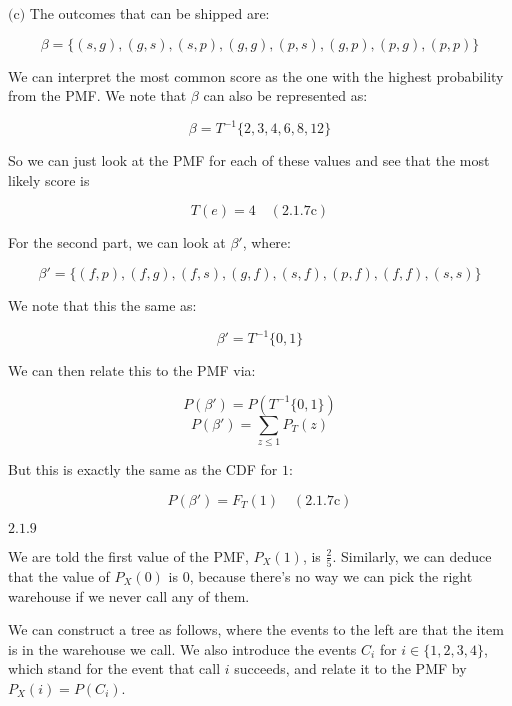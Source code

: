 \documentclass{article}
\newcommand{\problem}[2]{$\boxed{\text{#1.#2}}$}
\newcommand{\subproblem}[3]{$\boxed{\text{(#3)}}$}
\newcommand{\subsolution}[4]{\boxed{#4\quad(\text{#1.#2#3})}}
\newcommand{\inv}[1]{#1^{-1}}
\begin{document}
%
\subproblem{2.1}{7}{c} The outcomes that can be shipped are:

\[
\beta=\{(s,g),(g,s),(s,p),(g,g),(p,s),(g,p),(p,g),(p,p)\}
\]

We can interpret the most common score as the one with the highest
probability from the PMF. We note that $\beta$ can also be represented
as:

\[
\beta=\inv{T}\{2,3,4,6,8,12\}
\]

So we can just look at the PMF for each of these values and see that
the most likely score is

\[
\subsolution{2.1}{7}{c}{T(e)=4}
\]

For the second part, we can look at $\beta'$, where:

\[
\beta'=\{(f,p),(f,g),(f,s),(g,f),(s,f),(p,f),(f,f),(s,s)\}
\]

We note that this the same as:

\[
\beta'=\inv{T}\{0,1\}
\]

We can then relate this to the PMF via:

\[
P(\beta')=P(\inv{T}\{0,1\})
\] \[
P(\beta')=\sum\limits_{z\le1}P_T(z)
\]

But this is exactly the same as the CDF for $1$:

\[
\subsolution{2.1}{7}{c}{P(\beta')=F_T(1)}
\]

%
\problem{2.1}{9}

We are told the first value of the PMF, $P_X(1)$, is
$\frac{2}{5}$. Similarly, we can deduce that the value of $P_X(0)$ is
$0$, because there's no way we can pick the right warehouse if we
never call any of them.

We can construct a tree as follows, where the events to the left are
that the item is in the warehouse we call. We also introduce the
events $C_i$ for $i\in\{1,2,3,4\}$, which stand for the event that
call $i$ succeeds, and relate it to the PMF by $P_X(i)=P(C_i)$.

\begin{center}
\end{center}
\end{document}
